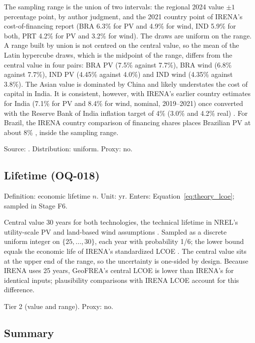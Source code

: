 The sampling range is the union of two intervals: the regional 2024 value
$\pm1$ percentage point, by author judgment, and the 2021 country point of
IRENA's cost-of-financing report (BRA 6.3\% for PV and 4.9\% for wind, IND 5.9\%
for both, PRT 4.2\% for PV and 3.2\% for wind). The draws are uniform on the
range. A range built by union is not centred on the central value, so the mean
of the Latin hypercube draws, which is the midpoint of the range, differs from
the central value in four pairs: BRA PV (7.5\% against 7.7\%), BRA wind (6.8\%
against 7.7\%), IND PV (4.45\% against 4.0\%) and IND wind (4.35\% against
3.8\%). The Asian value is dominated by China and likely
understates the cost of capital in India. It is consistent, however, with
IRENA's earlier country estimates for India (7.1\% for PV and 8.4\% for
wind, nominal, 2019--2021) once converted with the Reserve Bank of India
inflation target of 4\% (3.0\% and 4.2\% real) \cite{irena2023financing}.
For Brazil, the IRENA country comparison of financing shares places
Brazilian PV at about 8\% \cite{irena2025costs2024}, inside the sampling
range.

Source: \cite{irena2025costs2024}. Distribution: uniform. Proxy: no.

\subsection{Lifetime (OQ-018)}
\label{subsec:g2_lifetime}

Definition: economic lifetime $n$. Unit: yr. Enters:
Equation~\ref{eq:theory_lcoe}; sampled in Stage F6.

Central value 30 years for both technologies, the technical lifetime in
NREL's utility-scale PV and land-based wind assumptions
\cite{nrelATB2024definitions}. Sampled as a discrete uniform integer on
$\{25,\dots,30\}$, each year with probability 1/6; the lower bound equals
the economic life of IRENA's standardized LCOE \cite{irena2025costs2024}.
The central value sits at the upper end of the range, so the uncertainty
is one-sided by design. Because IRENA uses 25 years, GeoFREA's central
LCOE is lower than IRENA's for identical inputs; plausibility comparisons
with IRENA LCOE account for this difference.

Tier 2 (value and range). Proxy: no.

\subsection{Summary}
\label{subsec:g2_summary}

